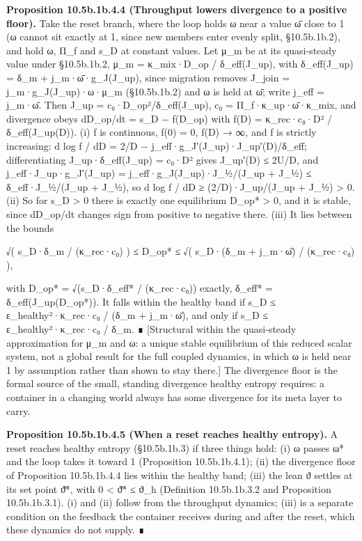 \documentclass[
]{article}
\begin{document}
\textbf{Proposition 10.5b.1b.4.4 (Throughput lowers divergence to a
positive floor).} Take the reset branch, where the loop holds ω near a
value ω̄ close to 1 (ω cannot sit exactly at 1, since new members enter
evenly split, §10.5b.1b.2), and hold ω, Π\_f and s\_D at constant
values. Let μ\_m be at its quasi-steady value under §10.5b.1b.2, μ\_m =
κ\_mix·D\_op / δ\_eff(J\_up), with δ\_eff(J\_up) = δ\_m +
j\_m·ω̄·g\_J(J\_up), since migration removes J\_join =
j\_m·g\_J(J\_up)·ω·μ\_m (§10.5b.1b.2) and ω is held at ω̄; write j\_eff =
j\_m·ω̄. Then J\_up = c₀·D\_op²/δ\_eff(J\_up), c₀ = Π\_f·κ\_up·ω̄·κ\_mix,
and divergence obeys dD\_op/dt = s\_D − f(D\_op) with f(D) =
κ\_rec·c₀·D² / δ\_eff(J\_up(D)). (i) f is continuous, f(0) = 0, f(D) →
∞, and f is strictly increasing: d log f / dD = 2/D −
j\_eff·g\_J′(J\_up)·J\_up′(D)/δ\_eff; differentiating
J\_up·δ\_eff(J\_up) = c₀·D² gives J\_up′(D) ≤ 2U/D, and
j\_eff·J\_up·g\_J′(J\_up) = j\_eff·g\_J(J\_up)·J\_½/(J\_up + J\_½) ≤
δ\_eff·J\_½/(J\_up + J\_½), so d log f / dD ≥ (2/D)·J\_up/(J\_up + J\_½)
\textgreater{} 0. (ii) So for s\_D \textgreater{} 0 there is exactly one
equilibrium D\_op* \textgreater{} 0, and it is stable, since dD\_op/dt
changes sign from positive to negative there. (iii) It lies between the
bounds

√( s\_D·δ\_m / (κ\_rec·c₀) ) ≤ D\_op* ≤ √( s\_D·(δ\_m + j\_m·ω̄) /
(κ\_rec·c₀) ),

with D\_op* = √(s\_D·δ\_eff* / (κ\_rec·c₀)) exactly, δ\_eff* =
δ\_eff(J\_up(D\_op*)). It falls within the healthy band if s\_D ≤
ε\_healthy²·κ\_rec·c₀ / (δ\_m + j\_m·ω̄), and only if s\_D ≤
ε\_healthy²·κ\_rec·c₀ / δ\_m. ∎ {[}Structural within the quasi-steady
approximation for μ\_m and ω: a unique stable equilibrium of this
reduced scalar system, not a global result for the full coupled
dynamics, in which ω is held near 1 by assumption rather than shown to
stay there.{]} The divergence floor is the formal source of the small,
standing divergence healthy entropy requires: a container in a changing
world always has some divergence for its meta layer to carry.

\textbf{Proposition 10.5b.1b.4.5 (When a reset reaches healthy
entropy).} A reset reaches healthy entropy (§10.5b.1b.3) if three things
hold: (i) ω passes ω* and the loop takes it toward 1 (Proposition
10.5b.1b.4.1); (ii) the divergence floor of Proposition 10.5b.1b.4.4
lies within the healthy band; (iii) the lean ϑ settles at its set point
ϑ̄*, with 0 \textless{} ϑ̄* ≤ ϑ\_h (Definition 10.5b.1b.3.2 and
Proposition 10.5b.1b.3.1). (i) and (ii) follow from the throughput
dynamics; (iii) is a separate condition on the feedback the container
receives during and after the reset, which these dynamics do not supply.
∎
\end{document}
